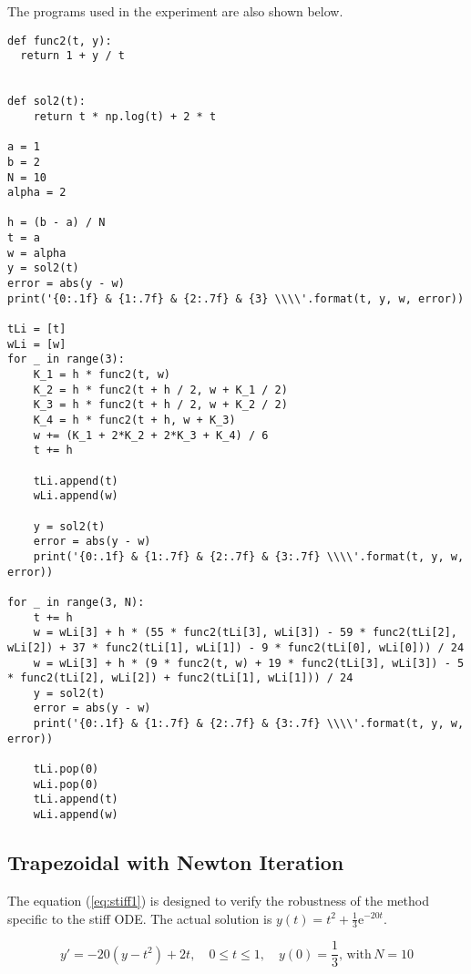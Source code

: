 \documentclass[preprint,12pt]{elsarticle}
\begin{document}
The programs used in the experiment are also shown below.

\begin{lstlisting}
def func2(t, y):
  return 1 + y / t


def sol2(t):
    return t * np.log(t) + 2 * t

a = 1
b = 2
N = 10
alpha = 2

h = (b - a) / N
t = a
w = alpha
y = sol2(t)
error = abs(y - w)
print('{0:.1f} & {1:.7f} & {2:.7f} & {3} \\\\'.format(t, y, w, error))

tLi = [t]
wLi = [w]
for _ in range(3):
    K_1 = h * func2(t, w)
    K_2 = h * func2(t + h / 2, w + K_1 / 2)
    K_3 = h * func2(t + h / 2, w + K_2 / 2)
    K_4 = h * func2(t + h, w + K_3)
    w += (K_1 + 2*K_2 + 2*K_3 + K_4) / 6
    t += h

    tLi.append(t)
    wLi.append(w)

    y = sol2(t)
    error = abs(y - w)
    print('{0:.1f} & {1:.7f} & {2:.7f} & {3:.7f} \\\\'.format(t, y, w, error))

for _ in range(3, N):
    t += h
    w = wLi[3] + h * (55 * func2(tLi[3], wLi[3]) - 59 * func2(tLi[2], wLi[2]) + 37 * func2(tLi[1], wLi[1]) - 9 * func2(tLi[0], wLi[0])) / 24
    w = wLi[3] + h * (9 * func2(t, w) + 19 * func2(tLi[3], wLi[3]) - 5 * func2(tLi[2], wLi[2]) + func2(tLi[1], wLi[1])) / 24
    y = sol2(t)
    error = abs(y - w)
    print('{0:.1f} & {1:.7f} & {2:.7f} & {3:.7f} \\\\'.format(t, y, w, error))
    
    tLi.pop(0)
    wLi.pop(0)
    tLi.append(t)
    wLi.append(w)
\end{lstlisting}

\subsection{Trapezoidal with Newton Iteration}
\label{SS:3.3}

The equation (\ref{eq:stiff1}) is designed to verify the robustness of the method specific to the stiff ODE. The actual solution is $y(t)=t^{2}+\frac{1}{3}\mathrm{e}^{-20t}$.

\begin{equation}
\label{eq:stiff1}
  y' = -20(y-t^{2}) + 2t,\quad 0\leq t\leq 1,\quad y(0)=\frac{1}{3},\,\mathrm{with}\,N=10
\end{equation}
\end{document}
